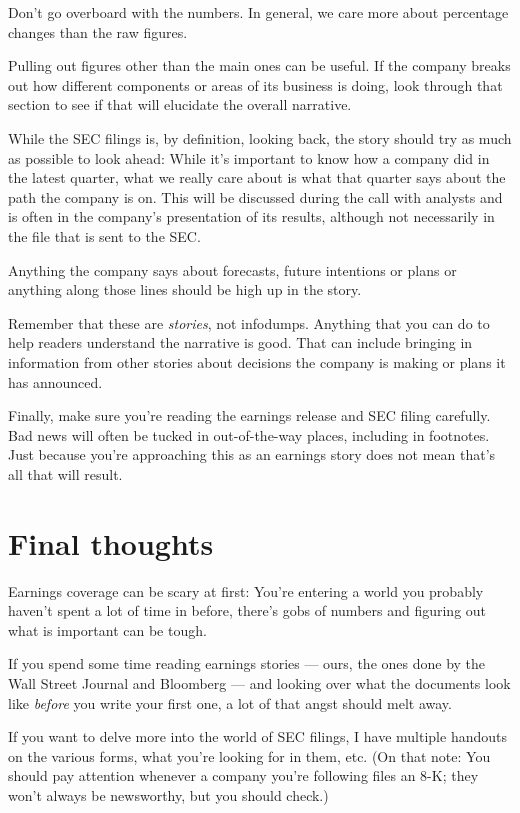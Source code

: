 \documentclass[
  11pt,
  american,
  letterpaperpaper,
  extrafontsizes,onecolumn,openright
  ]{memoir}
\begin{document}
Don't go overboard with the numbers. In general, we care more about percentage changes than the raw figures.

Pulling out figures other than the main ones can be useful. If the company breaks out how different components or areas of its business is doing, look through that section to see if that will elucidate the overall narrative.

While the SEC filings is, by definition, looking back, the story should try as much as possible to look ahead: While it's important to know how a company did in the latest quarter, what we really care about is what that quarter says about the path the company is on. This will be discussed during the call with analysts and is often in the company's presentation of its results, although not necessarily in the file that is sent to the SEC.

Anything the company says about forecasts, future intentions or plans or anything along those lines should be high up in the story.

Remember that these are \emph{stories}, not infodumps. Anything that you can do to help readers understand the narrative is good. That can include bringing in information from other stories about decisions the company is making or plans it has announced.

Finally, make sure you're reading the earnings release and SEC filing carefully. Bad news will often be tucked in out-of-the-way places, including in footnotes. Just because you're approaching this as an earnings story does not mean that's all that will result.

\hypertarget{final-thoughts-4}{%
\section*{Final thoughts}\label{final-thoughts-4}}

Earnings coverage can be scary at first: You're entering a world you probably haven't spent a lot of time in before, there's gobs of numbers and figuring out what is important can be tough.

If you spend some time reading earnings stories --- ours, the ones done by the Wall Street Journal and Bloomberg --- and looking over what the documents look like \emph{before} you write your first one, a lot of that angst should melt away.

If you want to delve more into the world of SEC filings, I have multiple handouts on the various forms, what you're looking for in them, etc. (On that note: You should pay attention whenever a company you're following files an 8-K; they won't always be newsworthy, but you should check.)
\end{document}
